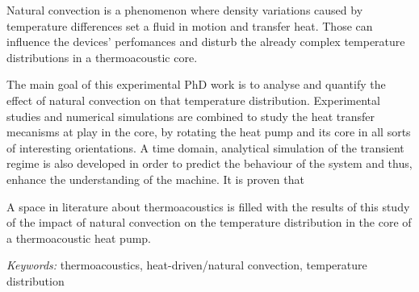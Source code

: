 {\begin{multicols}{2}
Natural convection is a phenomenon where density variations caused by temperature differences set a fluid in motion and transfer heat. Those can influence the devices' perfomances and disturb the already complex temperature distributions in a thermoacoustic core.

The main goal of this experimental PhD work is to analyse and quantify the effect of natural convection on that temperature distribution. Experimental studies and numerical simulations are combined to study the heat transfer mecanisms at play in the core, by rotating the heat pump and its core in all sorts of interesting orientations. A time domain, analytical simulation of the transient regime is also developed in order to predict the behaviour of the system and thus, enhance the understanding of the machine. It is proven that 

A space in literature about thermoacoustics is filled with the results of this study of the impact of natural convection on the temperature distribution in the core of a thermoacoustic heat pump.
\end{multicols}
\bigskip

{\large \textit{Keywords:}} thermoacoustics, heat-driven/natural convection, temperature distribution

\vfill
}